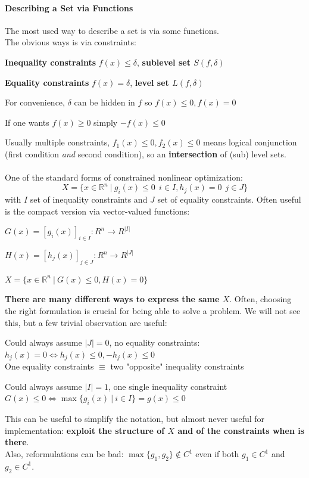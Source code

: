 \documentclass[10pt]{report}
\begin{document}
\paragraph{Describing a Set via Functions} The most used way to describe a set is via some functions.\\
The obvious ways is via constraints:
\begin{list}{}{}
	\item \textbf{Inequality constraints} $f(x)\leq\delta$, \textbf{sublevel set $S(f,\delta)$}
	\item \textbf{Equality constraints} $f(x)=\delta$, \textbf{level set $L(f,\delta)$}
	\item For convenience, $\delta$ can be hidden in $f$ so $f(x)\leq0,f(x)=0$
	\item If one wants $f(x)\geq 0$ simply $-f(x)\leq 0$
\end{list}
Usually multiple constraints, $f_1(x)\leq 0, f_2(x)\leq 0$ means logical conjunction (first condition \textit{and} second condition), so an \textbf{intersection} of (sub) level sets.\\\\
One of the standard forms of constrained nonlinear optimization:
$$X=\{x\in \mathbb{R}^n\:|\:g_i(x)\leq 0\:\:i\in I, h_j(x)=0\:\:j\in J\}$$
with $I$ set of inequality constraints and $J$ set of equality constraints. Often useful is the compact version via vector-valued functions:
\begin{list}{}{}
	\item $G(x) = [g_i(x)]_{i\in I} : R^n\rightarrow R^{|I|}$
	\item $H(x) = [h_j(x)]_{j\in J} : R^n\rightarrow R^{|J|}$
	\item $X=\{x\in \mathbb{R}^n\:|\:G(x)\leq 0, H(x) = 0\}$
\end{list}
\textbf{There are many different ways to express the same $X$}. Often, choosing the right formulation is crucial for being able to solve a problem. We will not see this, but a few trivial observation are useful:
\begin{list}{}{}
	\item Could always assume $|J|=0$, no equality constraints: $h_j(x) = 0\Leftrightarrow h_j(x)\leq 0, -h_j(x)\leq 0$\\
	One equality constraints $\equiv$ two "opposite" inequality constraints
	\item Could always assume $|I|=1$, one single inequality constraint\\
	$G(x)\leq 0\Leftrightarrow \max\{g_i(x)\:|\:i\in I\} = g(x)\leq 0$
\end{list}
This can be useful to simplify the notation, but almost never useful for implementation: \textbf{exploit the structure of $X$ and of the constraints when is there}.\\
Also, reformulations can be bad: $\max\{g_1,g_2\}\not\in C^1$ even if both $g_1\in C^1$ and $g_2\in C^1$.
\end{document}

